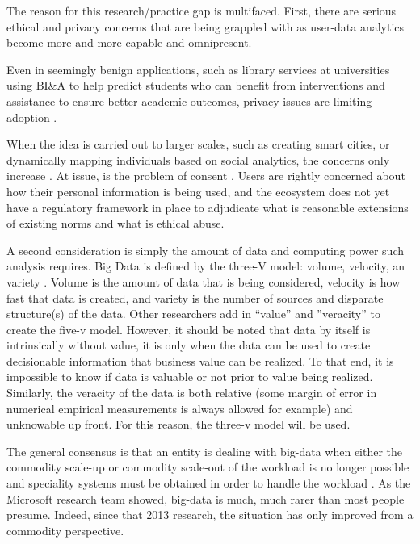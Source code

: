 The reason for this research/practice gap is multifaced. First, there are serious ethical and privacy concerns that are being grappled with as user-data analytics become more and more capable and omnipresent.

Even in seemingly benign applications, such as library services at universities using BI\&A to help predict students who can benefit from interventions and assistance to ensure better academic outcomes, privacy issues are limiting adoption \parencite{jonesJustBecauseYou2019}.

When the idea is carried out to larger scales, such as creating smart cities, or dynamically mapping individuals based on social analytics, the concerns only increase \parencite{changEthicalFrameworkBig2021}. At issue, is the problem of consent \parencite{soloveIntroductionPrivacySelfManagement2012}. Users are rightly concerned about how their personal information is being used, and the ecosystem does not yet have a regulatory framework in place to adjudicate what is reasonable extensions of existing norms and what is ethical abuse.

A second consideration is simply the amount of data and computing power such analysis requires. Big Data is defined by the three-V model: volume, velocity, an variety \parencite{wuDataMiningBig2014}. Volume is the amount of data that is being considered, velocity is how fast that data is created, and variety is the number of sources and disparate structure(s) of the data. Other researchers add in ``value'' and ''veracity'' to create the five-v model. However, it should be noted that data by itself is intrinsically without value, it is only when the data can be used to create decisionable information that business value can be realized. To that end, it is impossible to know if data is valuable or not prior to value being realized. Similarly, the veracity of the data is both relative (some margin of error in numerical empirical measurements is always allowed for example) and unknowable up front. For this reason, the three-v model will be used.

The general consensus is that an entity is dealing with big-data when either the commodity scale-up or commodity scale-out of the workload is no longer possible and speciality systems must be obtained in order to handle the workload \parencite{appuswamyNobodyEverGot2013}. As the Microsoft research team showed, big-data is much, much rarer than most people presume. Indeed, since that 2013 research, the situation has only improved from a commodity perspective.

